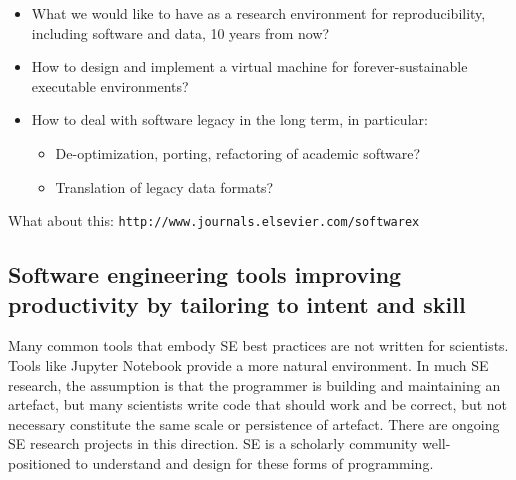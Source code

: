 \documentclass[a4paper,UKenglish]{dagman}
\begin{document}
\begin{itemize}
\item What we would like to have as a research environment for reproducibility, including  software and data, 10 years from now? 
\item How to design and implement a virtual machine for forever-sustainable executable environments? 
\item How to deal with software legacy in the long term, in particular:
    \begin{itemize}
    \item De-optimization, porting, refactoring of academic software?
    \item Translation of legacy data formats?
    \end{itemize}
\end{itemize}


What about this:
\texttt{http://www.journals.elsevier.com/softwarex}


\subsection{Software engineering tools improving productivity by tailoring to intent and skill}

Many common tools that embody SE best practices are not written for scientists. Tools like Jupyter Notebook provide a more natural environment. In much SE research, the assumption is that the programmer is building and maintaining an artefact, but many scientists write code that should work and be correct, but not necessary constitute the same scale or persistence of artefact. There are ongoing SE research projects in this direction. SE is a scholarly community well-positioned to understand and design for these forms of programming.
\end{document}
